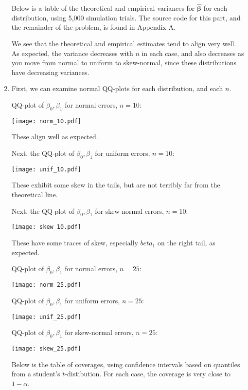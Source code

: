 \documentclass[11pt]{article}
\newcommand*\estim[1]{\widehat{#1}}
\newcommand*\bbeta{\boldsymbol{\beta}}
\renewcommand\;{\,}
\begin{document}
\begin{enumerate}[label=(\alph*)]
Below is a table of the theoretical and empirical variances for $\estim{\bbeta}$ for each distribution, using 5,000 simulation trials.
The source code for this part, and the remainder of the problem, is found in Appendix A.

We see that the theoretical and empirical estimates tend to align very well. As expected, the variance decreases with $n$ in each case, and also decreases as you move from normal to uniform to skew-normal, since these distributions have decreasing variances. 
\item
First, we can examine normal QQ-plots for each distribution, and each $n$.

QQ-plot of $\beta_0, \beta_1$ for normal errors, $n = 10$:
\begin{center}
\texttt{[image: norm\_10.pdf]}
\end{center}
These align well as expected.

Next, the QQ-plot of $\beta_0, \beta_1$ for uniform errors, $n = 10$:
\begin{center}
\texttt{[image: unif\_10.pdf]}
\end{center}
These exhibit some skew in the tails, but are not terribly far from the theoretical line. 

Next, the QQ-plot of $\beta_0, \beta_1$ for skew-normal errors, $n = 10$:
\begin{center}
\texttt{[image: skew\_10.pdf]}
\end{center}
These have some traces of skew, especially $beta_1$ on the right tail, as expected. 

QQ-plot of $\beta_0, \beta_1$ for normal errors, $n = 25$:
\begin{center}
\texttt{[image: norm\_25.pdf]}
\end{center}

QQ-plot of $\beta_0, \beta_1$ for uniform errors, $n = 25$:
\begin{center}
\texttt{[image: unif\_25.pdf]}
\end{center}

QQ-plot of $\beta_0, \beta_1$ for skew-normal errors, $n = 25$:
\begin{center}
\texttt{[image: skew\_25.pdf]}
\end{center}

Below is the table of coverages, using confidence intervals based on quantiles from a student's $t$-distibution. For each case, the coverage is very close to $1 - \alpha$. 



\end{enumerate}
\end{document}
